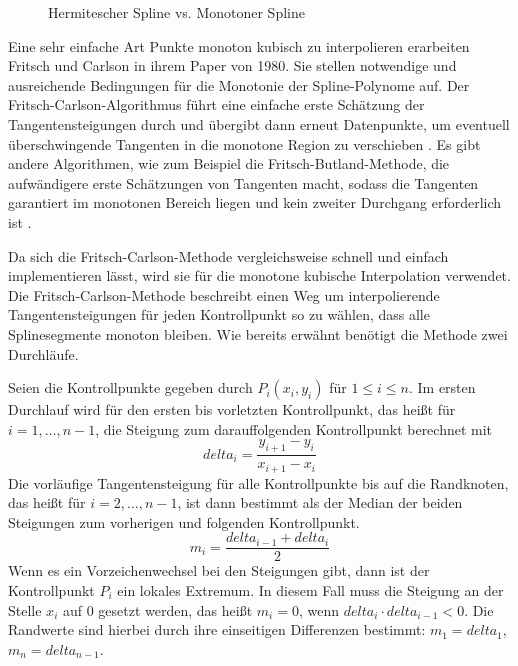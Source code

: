 \begin{figure}[H]
    \center
    \caption{Hermitescher Spline vs. Monotoner Spline}\label{fig:diffmonotone}
\end{figure}

Eine sehr einfache Art Punkte monoton kubisch zu interpolieren erarbeiten Fritsch und Carlson in ihrem Paper von 1980. Sie stellen notwendige und ausreichende Bedingungen für die Monotonie der Spline-Polynome auf. Der Fritsch-Carlson-Algorithmus führt eine einfache erste Schätzung der Tangentensteigungen durch und übergibt dann erneut Datenpunkte, um eventuell überschwingende Tangenten in die monotone Region zu verschieben \cite{Fritschcarlson:1980}. Es gibt andere Algorithmen, wie zum Beispiel die Fritsch-Butland-Methode, die aufwändigere erste Schätzungen von Tangenten macht, sodass die Tangenten garantiert im monotonen Bereich liegen und kein zweiter Durchgang erforderlich ist \cite{Fritschbutland:1984}.

Da sich die Fritsch-Carlson-Methode vergleichsweise schnell und einfach implementieren lässt, wird sie für die monotone kubische Interpolation verwendet. Die Fritsch-Carlson-Methode beschreibt einen Weg um interpolierende Tangentensteigungen für jeden Kontrollpunkt so zu wählen, dass alle Splinesegmente monoton bleiben. Wie bereits erwähnt benötigt die Methode zwei Durchläufe. 

Seien die Kontrollpunkte gegeben durch $P_i(x_i,y_i)$ für $1\le i \le n$.
Im ersten Durchlauf wird für den ersten bis vorletzten Kontrollpunkt, das heißt für $i=1,\dots,n-1$, die Steigung zum darauffolgenden Kontrollpunkt berechnet mit 
$$delta_i=\frac{y_{i+1}-y_i}{x_{i+1}-x_i}$$
Die vorläufige Tangentensteigung für alle Kontrollpunkte bis auf die Randknoten, das heißt für $i=2,\dots,n-1$, ist dann bestimmt als der Median der beiden Steigungen zum vorherigen und folgenden Kontrollpunkt.
$$m_i=\frac{delta_{i-1}+delta_i}{2}$$
Wenn es ein Vorzeichenwechsel bei den Steigungen gibt, dann ist der Kontrollpunkt $P_i$ ein lokales Extremum. In diesem Fall muss die Steigung an der Stelle $x_i$ auf $0$ gesetzt werden, das heißt
$m_i=0$, wenn $delta_i\cdot delta_{i-1} < 0$.
Die Randwerte sind hierbei durch ihre einseitigen Differenzen bestimmt:
$m_1=delta_1$, $m_{n}=delta_{n-1}$.

